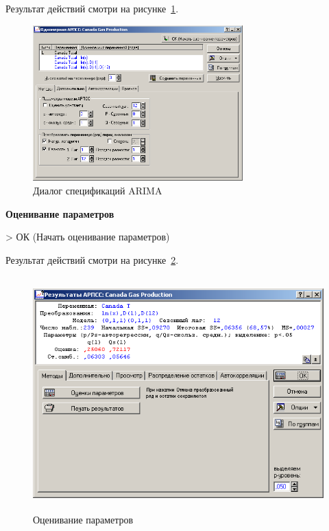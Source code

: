 Результат действий смотри на рисунке~\ref{fig:2_11}.

\begin{figure}[!h]
  \centering

  \includegraphics[height=6cm]
  {inc/Canada_Gas_Production/11.PNG}

  \caption{Диалог спецификаций ARIMA}

  \label{fig:2_11}
\end{figure}


\begin{center}
  \textbf{Оценивание параметров}
\end{center}

> ОК (Начать оценивание параметров)

Результат действий смотри на рисунке~\ref{fig:2_12}.

\begin{figure}[!h]
  \centering

  \includegraphics[height=9cm]
  {inc/Canada_Gas_Production/12.PNG}

  \caption{Оценивание параметров}

  \label{fig:2_12}
\end{figure}

